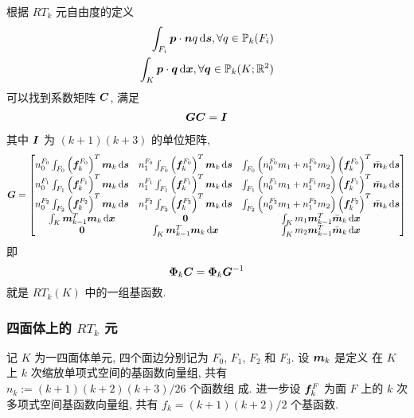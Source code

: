 \documentclass{article}
\begin{document}
根据 $RT_k$ 元自由度的定义
\begin{align*}
    \int_{F_i} {\boldsymbol p}\cdot{\boldsymbol n} q\,\mathrm d{\boldsymbol s}, \forall q \in {\mathbb P}_k(F_i)\\
    \int_K{\boldsymbol p}\cdot{\boldsymbol q}\,\mathrm d{\boldsymbol x}, \forall {\boldsymbol q} \in {\mathbb P}_k(K;{\mathbb R}^2)
\end{align*}
可以找到系数矩阵 ${\boldsymbol C}$, 满足 
\begin{align*}
    {\boldsymbol G}{\boldsymbol C} = {\boldsymbol I}
\end{align*}
其中 ${\boldsymbol I}$ 为 $(k+1)(k+3)$ 的单位矩阵, 
\begin{align*}
    {\boldsymbol G} = 
    \begin{bmatrix}
        n_{0}^{F_0} \int_{F_0} \left({\boldsymbol f}_{k}^{F_0}\right)^T{\boldsymbol m}_{k}\,\mathrm d{\boldsymbol s} & 
        n_{1}^{F_0} \int_{F_0} \left({\boldsymbol f}_{k}^{F_0}\right)^T{\boldsymbol m}_{k}\,\mathrm d{\boldsymbol s} & 
        \int_{F_0} 
        \left(n_{0}^{F_0}m_1 + n_{1}^{F_0} m_2\right)
        \left({\boldsymbol f}_{k}^{F_0}\right)^T\bar{{\boldsymbol m}}_{k}\,\mathrm d{\boldsymbol s} \\ 
        n_{0}^{F_1} \int_{F_1} \left({\boldsymbol f}_{k}^{F_1}\right)^T{\boldsymbol m}_{k}\,\mathrm d{\boldsymbol s} & 
        n_{1}^{F_1} \int_{F_1} \left({\boldsymbol f}_{k}^{F_1}\right)^T{\boldsymbol m}_{k}\,\mathrm d{\boldsymbol s} & 
        \int_{F_1} 
        \left(n_{0}^{F_1}m_1 + n_{1}^{F_1}m_2\right)
        \left({\boldsymbol f}_{k}^{F_1}\right)^T\bar{{\boldsymbol m}}_{k}\,\mathrm d{\boldsymbol s} \\ 
        n_{0}^{F_2} \int_{F_2} \left({\boldsymbol f}_{k}^{F_2}\right)^T{\boldsymbol m}_{k}\,\mathrm d{\boldsymbol s} & 
        n_{1}^{F_2} \int_{F_2} \left({\boldsymbol f}_{k}^{F_2}\right)^T{\boldsymbol m}_{k}\,\mathrm d{\boldsymbol s} & 
        \int_{F_2} 
        \left(n_{0}^{F_2}m_1 + n_{1}^{F_2}m_2\right)\left({\boldsymbol f}_{k}^{F_2}\right)^T\bar{{\boldsymbol m}}_{k}\,\mathrm d{\boldsymbol s} \\ 
        \int_{K} {\boldsymbol m}_{k-1}^T{\boldsymbol m}_{k}\,\mathrm d{\boldsymbol x} & \mathbf 0 & 
        \int_{K} m_1{\boldsymbol m}_{k-1}^T\bar{{\boldsymbol m}}_{k} \,\mathrm d{\boldsymbol x} \\ 
        \mathbf 0 & \int_{K} {\boldsymbol m}_{k-1}^T{\boldsymbol m}_{k}\,\mathrm d{\boldsymbol x} & \int_{K}
        m_2{\boldsymbol m}_{k-1}^T\bar{{\boldsymbol m}}_{k} \,\mathrm d{\boldsymbol x} \\ 
    \end{bmatrix}
\end{align*}
即
$$
{\bm \Phi}_k{\boldsymbol C} = {\bm \Phi}_k{\boldsymbol G}^{-1}
$$
就是 $RT_k(K)$ 中的一组基函数. 

\subsubsection{四面体上的 $RT_k$ 元}
记 $K$ 为一四面体单元, 四个面边分别记为 $F_0$, $F_1$, $F_2$ 和 $F_3$. 设 ${\boldsymbol m}_k$ 是定义
在 $K$ 上 $k$ 次缩放单项式空间的基函数向量组, 共有 $n_k:=(k+1)(k+2)(k+3)/26$ 个函数组
成. 进一步设 ${\boldsymbol f}_{k}^F$ 为面 $F$ 上的 $k$ 次多项式空间基函数向量组,
共有 $f_k = (k+1)(k+2)/2$ 个基函数.
\end{document}
